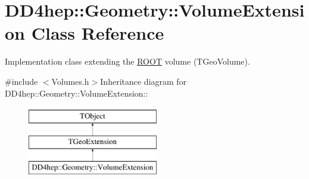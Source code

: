 \hypertarget{class_d_d4hep_1_1_geometry_1_1_volume_extension}{
\section{DD4hep::Geometry::VolumeExtension Class Reference}
\label{class_d_d4hep_1_1_geometry_1_1_volume_extension}
}


Implementation class extending the \hyperlink{namespace_r_o_o_t}{ROOT} volume (TGeoVolume).  


{\ttfamily \#include $<$Volumes.h$>$}Inheritance diagram for DD4hep::Geometry::VolumeExtension::\begin{figure}[H]
\begin{center}
\leavevmode
\includegraphics[height=3cm]{class_d_d4hep_1_1_geometry_1_1_volume_extension}
\end{center}
\end{figure}
